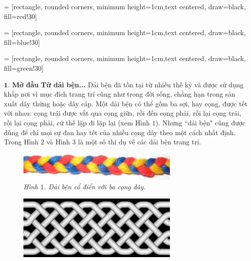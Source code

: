 \vspace*{150pt}

 = [rectangle, rounded corners, minimum height=1cm,text centered, draw=black, fill=red!30]

 = [rectangle, rounded corners, minimum height=1cm,text centered, draw=black, fill=blue!30]

 = [rectangle, rounded corners, minimum height=1cm,text centered, draw=black, fill=green!30]

\begin{multicols}{2}	
	$\pmb{1.}$ \textbf{\color{duongvaotoanhoc}Mở đầu}
	\vskip 0.1cm
	\textbf{\color{duongvaotoanhoc}Từ dải bện...}
	\vskip 0.1cm
	Dải bện đã tồn tại từ nhiều thế kỷ và được sử dụng khắp nơi vì mục đích trang trí cũng như trong đời sống, chẳng hạn trong sản xuất dây thừng hoặc dây cáp. Một dải bện có thể gồm ba sợi, hay cọng, được tết với nhau: cọng trái được vắt qua cọng giữa, rồi đến cọng phải, rồi lại cọng trái, rồi lại cọng phải, cứ thế lặp đi lặp lại (xem Hình $1$). Nhưng ``dải bện" cũng được dùng để chỉ mọi sự đan hay tết của nhiều cọng dây theo một cách nhất định. Trong Hình $2$ và Hình $3$ là một số thí dụ về các dải bện trang trí.
	\begin{figure}[H]
		\vspace*{-5pt}
		\centering
		\captionsetup{labelformat= empty, justification=centering}
		\includegraphics[width= 1\linewidth]{fig_01}
		\caption{\small\textit{\color{duongvaotoanhoc}Hình $1$. Dải bện cổ điển với ba cọng dây.}}
		\vspace*{-10pt}
	\end{figure}
	\begin{figure}[H]
		\vspace*{-5pt}
		\centering
		\captionsetup{labelformat= empty, justification=centering}
		\includegraphics[width= 1\linewidth]{fig_02}

\end{figure}
\end{multicols}
